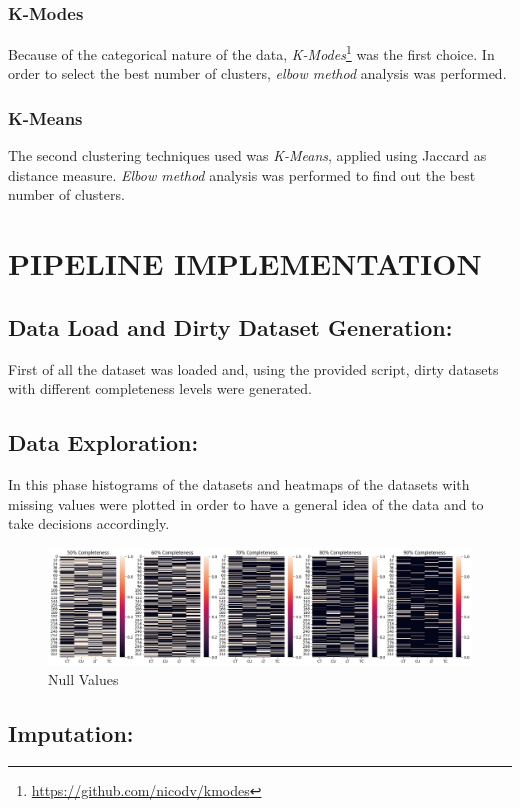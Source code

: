 \documentclass{article}
\begin{document}
\subsubsection{K-Modes}
Because of the categorical nature of the data, \emph{K-Modes}\footnote{\url{https://github.com/nicodv/kmodes}} was the first choice. In order to select the best number of clusters, \emph{elbow method} analysis was performed.

\subsubsection{K-Means}
The second clustering techniques used was \emph{K-Means}, applied using Jaccard as distance measure. \emph{Elbow method} analysis was performed to find out the best number of clusters.

\newpage
\section{PIPELINE IMPLEMENTATION}

	\subsection{Data Load and Dirty Dataset Generation:} First of all the dataset was loaded and, using the provided script, dirty datasets with different completeness levels were generated.
	\subsection{Data Exploration:} In this phase histograms of the datasets and heatmaps of the datasets with missing values were plotted in order to have a general idea of the data and to take decisions accordingly.
\begin{figure}[h]
	\includegraphics[width=\textwidth]{img/heatmaps.png}
	\caption{Null Values}
\end{figure}

\subsection{Imputation:}
\end{document}
